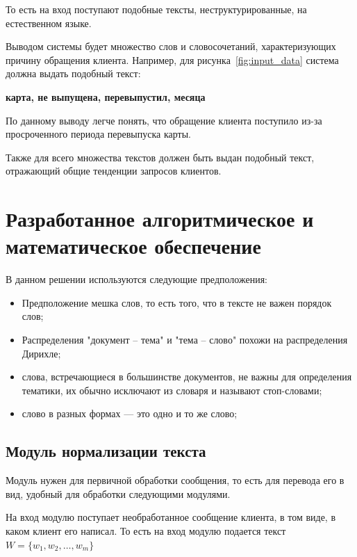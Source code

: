 \documentclass[a4paper,12pt,preview]{report} %
\begin{document}
	То есть на вход поступают подобные тексты, неструктурированные, на естественном языке.
	
	Выводом системы будет множество слов и словосочетаний, характеризующих причину обращения клиента. Например, для рисунка~\ref{fig:input_data} система должна выдать подобный текст:
	
	\begin{center}
		\textbf{карта, не выпущена, перевыпустил, месяца}
	\end{center}
	
	
	По данному выводу легче понять, что обращение клиента поступило из-за просроченного периода перевыпуска карты.
	
	
	Также для всего множества текстов должен быть выдан подобный текст, отражающий общие тенденции запросов клиентов.
	
	
	
	\section{Разработанное алгоритмическое и математическое обеспечение}
	
	
	В данном решении используются следующие предположения:
	
	\begin{itemize}
		\item Предположение мешка слов, то есть того, что в тексте не важен порядок слов;
		\item Распределения "документ -- тема" и "тема -- слово" похожи на распределения Дирихле;
		\item слова, встречающиеся в большинстве документов, не важны для определения тематики, их обычно исключают из словаря и называют стоп-словами;
		\item слово в разных формах — это одно и то же слово;
	\end{itemize}
	
	\subsection{Модуль нормализации текста}
	
	Модуль нужен для первичной обработки сообщения, то есть для перевода его в вид, удобный для обработки следующими модулями. 
	
	На вход модулю поступает необработанное сообщение клиента, в том виде, в каком клиент его написал. То есть на вход модулю подается текст $W = \{w_1, w_2, \dots, w_m\}$
	
\end{document}
